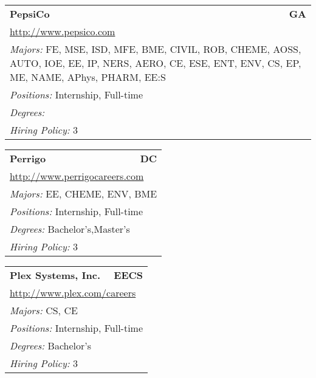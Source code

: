 \documentclass[twoside]{article}
\begin{document}
\begin{center}
\begin{multicols}{3}
\begin{FlushLeft}
\begin{minipage}{\columnwidth}
\end{minipage}
 
\begin{minipage}{\columnwidth}\begin{tabularx}{.95\columnwidth}{Xr}
                 {\Large\bf PepsiCo} & {\Large\bf GA}\\
    \multicolumn{2}{p{.95\columnwidth}}{\url{http://www.pepsico.com}}\\
    \multicolumn{2}{p{.95\columnwidth}}{\emph{Majors:} FE, MSE, ISD, MFE, BME, CIVIL, ROB, CHEME, AOSS, AUTO, IOE, EE, IP, NERS, AERO, CE, ESE, ENT, ENV, CS, EP, ME, NAME, APhys, PHARM, EE:S}\\
    \multicolumn{2}{p{.95\columnwidth}}{\emph{Positions:} Internship, Full-time}\\
    \multicolumn{2}{p{.95\columnwidth}}{\emph{Degrees:} }\\
    \multicolumn{2}{p{.95\columnwidth}}{\emph{Hiring Policy:} 3}\\
    \end{tabularx}
    
\end{minipage}
 
\begin{minipage}{\columnwidth}\begin{tabularx}{.95\columnwidth}{Xr}
                 {\Large\bf Perrigo} & {\Large\bf DC}\\
    \multicolumn{2}{p{.95\columnwidth}}{\url{http://www.perrigocareers.com}}\\
    \multicolumn{2}{p{.95\columnwidth}}{\emph{Majors:} EE, CHEME, ENV, BME}\\
    \multicolumn{2}{p{.95\columnwidth}}{\emph{Positions:} Internship, Full-time}\\
    \multicolumn{2}{p{.95\columnwidth}}{\emph{Degrees:} Bachelor's,Master's}\\
    \multicolumn{2}{p{.95\columnwidth}}{\emph{Hiring Policy:} 3}\\
    \end{tabularx}
    
\end{minipage}
 
\begin{minipage}{\columnwidth}\begin{tabularx}{.95\columnwidth}{Xr}
                 {\Large\bf Plex Systems, Inc.} & {\Large\bf EECS}\\
    \multicolumn{2}{p{.95\columnwidth}}{\url{http://www.plex.com/careers}}\\
    \multicolumn{2}{p{.95\columnwidth}}{\emph{Majors:} CS, CE}\\
    \multicolumn{2}{p{.95\columnwidth}}{\emph{Positions:} Internship, Full-time}\\
    \multicolumn{2}{p{.95\columnwidth}}{\emph{Degrees:} Bachelor's}\\
    \multicolumn{2}{p{.95\columnwidth}}{\emph{Hiring Policy:} 3}\\
    \end{tabularx}
    

\end{minipage}
\end{FlushLeft}
\end{multicols}
\end{center}
\end{document}
